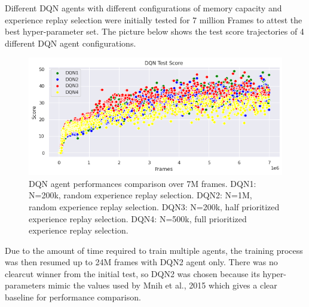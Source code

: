 \documentclass{article}
\begin{document}
Different DQN agents with different configurations of memory capacity and experience replay selection were initially tested for 7 million Frames to attest the best hyper-parameter set. The picture below shows the test score trajectories of 4 different DQN agent configurations.
\begin{figure}[H]
\centering
\includegraphics[scale=0.5]{DQNAgentComparison.PNG}
\caption{DQN agent performances comparison over 7M frames. DQN1: N=200k, random experience replay selection. DQN2: N=1M, random experience replay selection. DQN3: N=200k, half prioritized experience replay selection. DQN4: N=500k, full prioritized experience replay selection.}
\label{fig:DQNAgentComparison}
\end{figure}

Due to the amount of time required to train multiple agents, the training process was then resumed up to 24M frames with DQN2 agent only. There was no clearcut winner from the initial test, so DQN2 was chosen because its hyper-parameters mimic the values used by Mnih et al., 2015 which gives a clear baseline for performance comparison.
\end{document}
